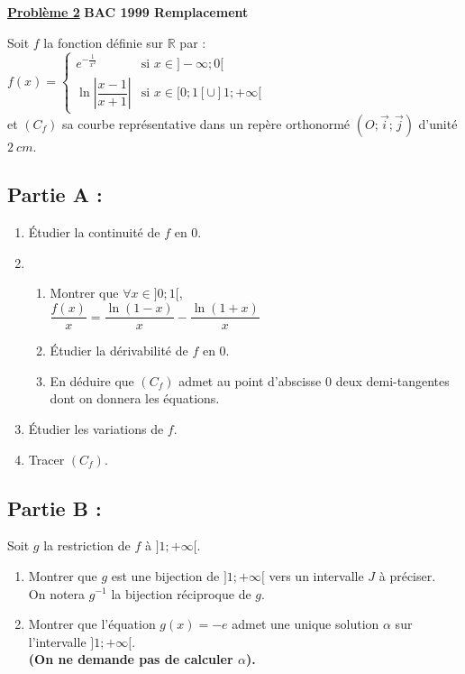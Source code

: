 \documentclass[12pt,a4paper]{article}
\newcommand{\exo}[1]{%
        \textbf{\underline{Problème #1}}
}
\begin{document}
\begin{multicols}{2}
\exo{2} \textbf{BAC 1999 Remplacement}

Soit \( f \) la fonction définie sur \( \mathbb{R} \) par :\\
\(
f(x) =
\begin{cases}
e^{-\frac{1}{x^2}} & \text{si } x \in ]-\infty ; 0[ \\
\ln\left|\dfrac{x - 1}{x + 1}\right| & \text{si } x \in [0 ; 1[ \cup ]1 ; +\infty[
\end{cases}
\)\\
et \( (C_f) \) sa courbe représentative dans un repère orthonormé \( (O ; \vec{i} ; \vec{j}) \) d’unité \( 2\ cm \).

\subsection*{Partie A : }
\begin{enumerate}
    \item Étudier la continuité de \( f \) en 0.
    \item 
    \begin{enumerate}
        \item Montrer que \( \forall x \in ]0 ; 1[ \),\\
        \( \dfrac{f(x)}{x} = \dfrac{\ln(1 - x)}{x} - \dfrac{\ln(1 + x)}{x} \)
        \item Étudier la dérivabilité de \( f \) en 0.
        \item En déduire que \( (C_f) \) admet au point d’abscisse 0 deux demi-tangentes dont on donnera les équations.
    \end{enumerate}
        \item Étudier les variations de \( f \).
				\item Tracer \( (C_f) \).
\end{enumerate}				
    \subsection*{Partie B : } Soit \( g \) la restriction de \( f \) à \( ]1 ; +\infty[ \).
\begin{enumerate}

    \item Montrer que \( g \) est une bijection de \( ]1 ; +\infty[ \) vers un intervalle \( J \) à préciser.\\
    On notera \( g^{-1} \) la bijection réciproque de \( g \).

    \item Montrer que l’équation \( g(x) = -e \) admet une unique solution \( \alpha \) sur l’intervalle \( ]1 ; +\infty[ \).\\
    \textbf{(On ne demande pas de calculer \( \alpha \)).}


\end{enumerate}
\end{multicols}
\end{document}
